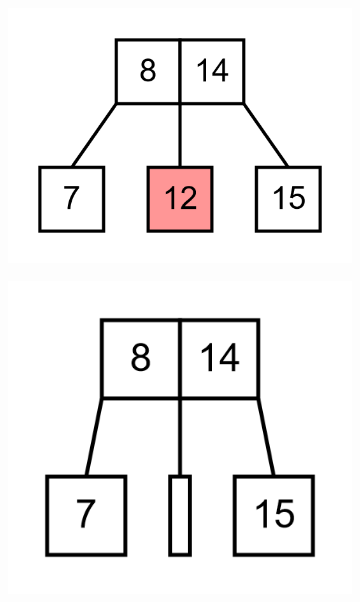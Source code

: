 \documentclass[11pt,a4paper]{article}
\begin{document}
\begin{loesung}
\begin{enumerate}
\begin{figure}[h!]
\begin{subfigure}[b]{0.31\textwidth}
                \includegraphics[scale=0.15]{img/3e/17}
            \end{subfigure}
            \begin{subfigure}[b]{0.31\textwidth}
                \centering
                \includegraphics[scale=0.15]{img/3e/18}
            \end{subfigure}
            \begin{subfigure}[b]{0.31\textwidth}
                \centering

\end{subfigure}
\end{figure}
\end{enumerate}
\end{loesung}
\end{document}
